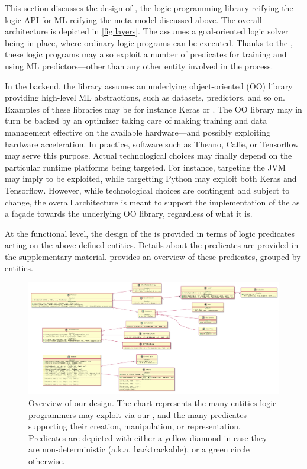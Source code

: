 \documentclass[
]{ceurart}
\begin{document}
This section discusses the design of \mllib, the logic programming library reifying the logic API for ML reifying the meta-model discussed above.
%
The overall architecture is depicted in \cref{fig:layers}.
%
The \mllib{} assumes a goal-oriented logic solver being in place, where ordinary logic programs can be executed.
%
Thanks to the \mllib{}, these logic programs may also exploit a number of predicates for training and using ML predictors---other than any other entity involved in the process.

In the backend, the library assumes an underlying object-oriented (OO) library providing high-level ML abstractions, such as datasets, predictors, and so on.
%
Examples of these libraries may be for instance Keras \cite{chollet2015keras} or \deeplearningforj{} \cite{DL4J}.
%
The OO library may in turn be backed by an optimizer taking care of making training and data management effective on the available hardware---and possibly exploiting hardware acceleration.
%
In practice, software such as Theano, Caffe, or Tensorflow may serve this purpose.
%
Actual technological choices may finally depend on the particular runtime platforms being targeted.
%
For instance, targeting the JVM may imply \deeplearningforj{} to be exploited, while targetting Python may exploit both Keras and Tensorflow.
%
However, while technological choices are contingent and subject to change, the overall architecture is meant to support the implementation of the \mllib{} as a façade towards the underlying OO library, regardless of what it is.

At the functional level, the design of the \mllib{} is provided in terms of logic predicates acting on the above defined entities.
%
Details about the predicates are provided in the supplementary material.
%
 provides an overview of these predicates, grouped by entities.

    \begin{figure}
        \centering
        \includegraphics[width=\linewidth]{figures/entities.pdf}
        \caption{Overview of our \mllib{} design. The chart represents the many entities logic programmers may exploit via our \mllib{}, and the many predicates supporting their creation, manipulation, or representation. Predicates are depicted with either a yellow diamond in case they are non-deterministic (a.k.a. backtrackable), or a green circle otherwise.}
        \label{fig:design-overview}
    \end{figure}
\end{document}
